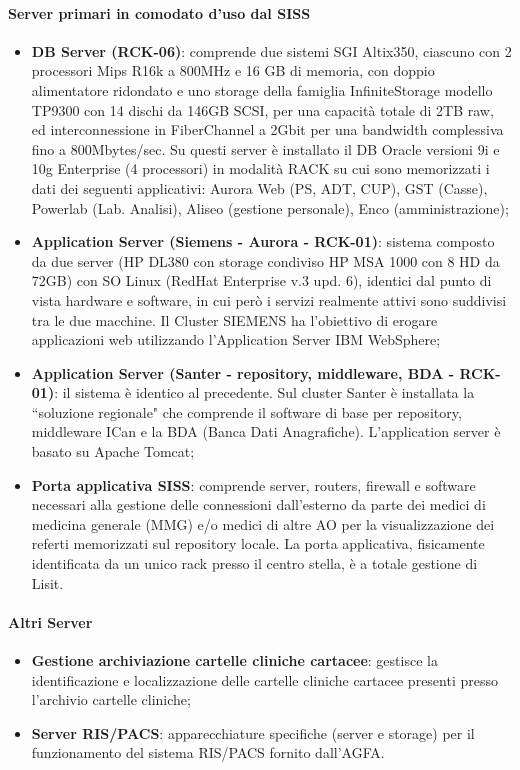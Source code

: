 \documentclass[12pt, a4paper, titlepage]{report}
\newcommand{\myparagraph}[1]{\paragraph{#1}\mbox{} \mbox{}}
\begin{document}
		\myparagraph{Server primari in comodato d'uso dal SISS}
		
		\begin{itemize}
			\item \textbf{DB Server (RCK-06)}: comprende due sistemi SGI Altix350, ciascuno con 2 processori Mips R16k a 800MHz e 16 GB di memoria, con doppio alimentatore ridondato e uno storage della famiglia InfiniteStorage modello TP9300 con 14 dischi da 146GB SCSI, per una capacità totale di 2TB raw, ed interconnessione in FiberChannel a 2Gbit per una bandwidth complessiva fino a 800Mbytes/sec.
			Su questi server è installato il DB Oracle versioni 9i e 10g Enterprise (4 processori) in
			modalità RACK su cui sono memorizzati i dati dei seguenti applicativi: Aurora Web (PS, ADT, CUP), GST (Casse), Powerlab (Lab. Analisi), Aliseo (gestione personale), Enco (amministrazione);
			\item \textbf{Application Server (Siemens - Aurora - RCK-01)}: sistema composto da due server (HP DL380 con storage condiviso HP MSA 1000 con 8 HD da 72GB) con SO Linux (RedHat Enterprise v.3 upd. 6), identici dal punto di vista hardware e software, in cui però i servizi realmente attivi sono suddivisi tra le due macchine.
			Il Cluster SIEMENS ha l'obiettivo di erogare applicazioni web utilizzando l'Application Server IBM WebSphere;
			\item \textbf{Application Server (Santer - repository, middleware, BDA - RCK-01)}: il sistema è identico al precedente. Sul cluster Santer è installata la ``soluzione regionale" che comprende il software di base per repository, middleware ICan e la BDA (Banca Dati Anagrafiche). L'application server è basato su Apache Tomcat;
			\item \textbf{Porta applicativa SISS}: comprende server, routers, firewall e software necessari alla gestione delle connessioni dall'esterno da parte dei medici di medicina generale (MMG) e/o medici di altre AO per la visualizzazione dei referti memorizzati sul repository locale. La porta applicativa, fisicamente identificata da un unico rack presso il centro stella, è a totale gestione di Lisit.
		\end{itemize}
		
		\myparagraph{Altri Server}
		
		\begin{itemize}
			\item \textbf{Gestione archiviazione cartelle cliniche cartacee}: gestisce la identificazione e localizzazione delle cartelle cliniche cartacee presenti presso l'archivio cartelle cliniche;
			\item \textbf{Server RIS/PACS}: apparecchiature specifiche (server e storage) per il funzionamento del sistema RIS/PACS fornito dall'AGFA.
		\end{itemize}
		
\end{document}
